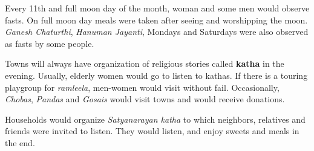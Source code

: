 Every 11th and full moon day of the month, woman and some men would observe
fasts. On full moon day meals were taken after seeing and worshipping the moon.
\textit{Ganesh Chaturthi}, \textit{Hanuman Jayanti}, Mondays and Saturdays were
also observed as fasts by some people.

Towns will always have organization of religious stories called \textbf{katha}
in the evening. Usually, elderly women would go to listen to kathas. If there
is a touring playgroup for \textit{ramleela}, men-women would visit without
fail. Occasionally, \textit{Chobas}, \textit{Pandas} and \textit{Gosais} would
visit towns and would receive donations.

Households would organize \textit{Satyanarayan katha} to which neighbors,
relatives and friends were invited to listen. They would listen, and enjoy
sweets and meals in the end.

